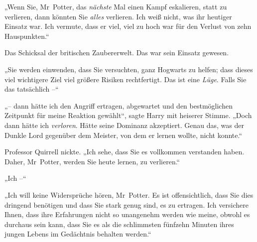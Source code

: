 „Wenn Sie, Mr~Potter, das \emph{nächste} Mal einen Kampf eskalieren, statt zu verlieren, dann könnten Sie \emph{alles} verlieren. Ich weiß nicht, was ihr heutiger Einsatz war. Ich vermute, dass er viel, viel zu hoch war für den Verlust von zehn Hauspunkten.“

Das Schicksal der britischen Zaubererwelt. Das war sein Einsatz gewesen.

„Sie werden einwenden, dass Sie versuchten, ganz Hogwarts zu helfen; dass dieses viel wichtigere Ziel viel größere Risiken rechtfertigt. Das ist eine \emph{Lüge}. Falls Sie das tatsächlich –“

„– dann hätte ich den Angriff ertragen, abgewartet und den bestmöglichen Zeitpunkt für meine Reaktion gewählt“, sagte Harry mit heiserer Stimme. „Doch dann hätte ich \emph{verloren}. Hätte seine Dominanz akzeptiert. Genau das, was der Dunkle Lord gegenüber dem Meister, von dem er lernen wollte, nicht konnte.“

Professor Quirrell nickte. „Ich sehe, dass Sie es vollkommen verstanden haben. Daher, Mr~Potter, werden Sie heute lernen, zu verlieren.“

„Ich –“

„Ich will keine Widersprüche hören, Mr~Potter. Es ist offensichtlich, dass Sie dies dringend benötigen und dass Sie stark genug sind, es zu ertragen. Ich versichere Ihnen, dass ihre Erfahrungen nicht so unangenehm werden wie meine, obwohl es durchaus sein kann, dass Sie es als die schlimmsten fünfzehn Minuten ihres jungen Lebens im Gedächtnis behalten werden.“

